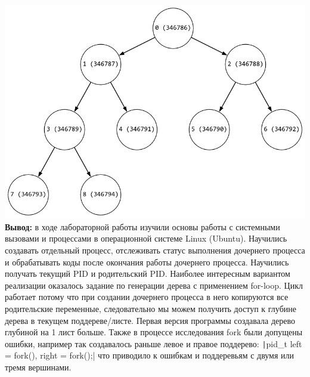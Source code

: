 \documentclass[a4paper,14pt]{extarticle}
\begin{document}
\includegraphics[width=140mm]{modified.png}\\

\textbf{Вывод: } в ходе лабораторной работы изучили основы работы с системными вызовами и процессами в операционной
системе Linux (Ubuntu). Научились создавать отдельный процесс, отслеживать статус выполнения дочернего процесса и обрабатывать 
коды после окончания работы дочернего процесса. Научились получать текущий PID и родительский PID. 
Наиболее интересным вариантом реализации оказалось задание по генерации дерева с применением for-loop. 
Цикл работает потому что при создании дочернего процесса в него копируются все родительские переменные, 
следовательно мы можем получить доступ к глубине дерева в текущем поддереве/листе. Первая версия программы
создавала дерево глубиной на 1 лист больше. Также в процессе исследования fork были допущены ошибки, например так
создавалось раньше левое и правое поддерево: \texttt|pid_t left = fork(), right = fork();| что приводило к ошибкам
и поддеревьям с двумя или тремя вершинами. 
\end{document}

